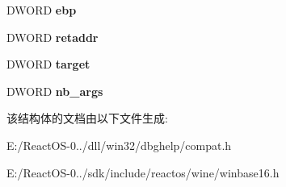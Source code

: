 \begin{DoxyCompactItemize}
D\+W\+O\+RD {\bfseries ebp}
\item 
\mbox{\label{struct___s_t_a_c_k32_f_r_a_m_e_a7c4728297f78d0f9ca17adc12bf7c4e9}} 
D\+W\+O\+RD {\bfseries retaddr}
\item 
\mbox{\label{struct___s_t_a_c_k32_f_r_a_m_e_a7f7ddc54b2ed8d8bbe4f363aa918ec11}} 
D\+W\+O\+RD {\bfseries target}
\item 
\mbox{\label{struct___s_t_a_c_k32_f_r_a_m_e_ac9813f53c7e6f3cb91e6baa9fe989860}} 
D\+W\+O\+RD {\bfseries nb\+\_\+args}
\end{DoxyCompactItemize}


该结构体的文档由以下文件生成\+:\begin{DoxyCompactItemize}
\item 
E\+:/\+React\+O\+S-\/0../dll/win32/dbghelp/compat.\+h\item 
E\+:/\+React\+O\+S-\/0../sdk/include/reactos/wine/winbase16.\+h\end{DoxyCompactItemize}
